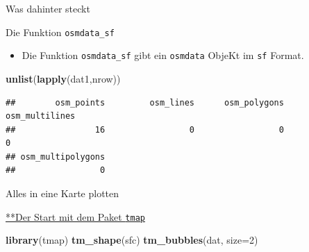 \documentclass[ignorenonframetext,]{beamer}
\newenvironment{Shaded}{\begin{snugshade}}{\end{snugshade}}
\newcommand{\KeywordTok}[1]{\textcolor[rgb]{0.13,0.29,0.53}{\textbf{#1}}}
\newcommand{\DataTypeTok}[1]{\textcolor[rgb]{0.13,0.29,0.53}{#1}}
\newcommand{\DecValTok}[1]{\textcolor[rgb]{0.00,0.00,0.81}{#1}}
\newcommand{\StringTok}[1]{\textcolor[rgb]{0.31,0.60,0.02}{#1}}
\newcommand{\OperatorTok}[1]{\textcolor[rgb]{0.81,0.36,0.00}{\textbf{#1}}}
\newcommand{\NormalTok}[1]{#1}
\providecommand{\tightlist}{%
  \setlength{\itemsep}{0pt}\setlength{\parskip}{0pt}}
\begin{document}
\begin{frame}{Was dahinter steckt}

\end{frame}

\begin{frame}[fragile]{Die Funktion \texttt{osmdata\_sf}}

\begin{itemize}
\tightlist
\item
  Die Funktion \texttt{osmdata\_sf} gibt ein \texttt{osmdata} ObjeKt im
  \texttt{sf} Format.
\end{itemize}

\begin{Shaded}
\end{Shaded}

\begin{Shaded}
\begin{Highlighting}[]
\KeywordTok{unlist}\NormalTok{(}\KeywordTok{lapply}\NormalTok{(dat1,nrow))}
\end{Highlighting}
\end{Shaded}

\begin{verbatim}
##        osm_points         osm_lines      osm_polygons    osm_multilines 
##                16                 0                 0                 0 
## osm_multipolygons 
##                 0
\end{verbatim}

\end{frame}

\begin{frame}[fragile]{Alles in eine Karte plotten}

\begin{block}{\href{https://cran.r-project.org/web/packages/tmap/vignettes/tmap-getstarted.html}{**Der
Start mit dem Paket \texttt{tmap}}}

\begin{Shaded}
\begin{Highlighting}[]
\KeywordTok{library}\NormalTok{(tmap)}
\KeywordTok{tm_shape}\NormalTok{(sfc) }
\KeywordTok{tm_bubbles}\NormalTok{(dat, }\DataTypeTok{size=}\DecValTok{2}\NormalTok{)}
\end{Highlighting}
\end{Shaded}

\end{block}

\end{frame}
\end{document}
